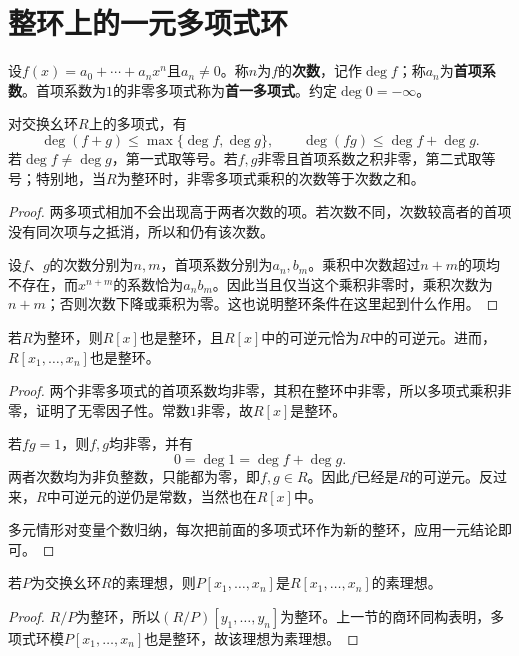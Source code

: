 \section{整环上的一元多项式环}

\begin{definition}
设$f(x)=a_0+\cdots+a_nx^n$且$a_n\ne0$。称$n$为$f$的\textbf{次数}，记作$\deg f$；称$a_n$为\textbf{首项系数}。首项系数为$1$的非零多项式称为\textbf{首一多项式}。约定$\deg0=-\infty$。
\end{definition}

\begin{proposition}
对交换幺环$R$上的多项式，有
\[
\deg(f+g)\le\max\{\deg f,\deg g\},\qquad
\deg(fg)\le\deg f+\deg g.
\]
若$\deg f\ne\deg g$，第一式取等号。若$f,g$非零且首项系数之积非零，第二式取等号；特别地，当$R$为整环时，非零多项式乘积的次数等于次数之和。
\end{proposition}
\begin{proof}
两多项式相加不会出现高于两者次数的项。若次数不同，次数较高者的首项没有同次项与之抵消，所以和仍有该次数。

设$f$、$g$的次数分别为$n,m$，首项系数分别为$a_n,b_m$。乘积中次数超过$n+m$的项均不存在，而$x^{n+m}$的系数恰为$a_nb_m$。因此当且仅当这个乘积非零时，乘积次数为$n+m$；否则次数下降或乘积为零。这也说明整环条件在这里起到什么作用。
\end{proof}

\begin{proposition}
若$R$为整环，则$R[x]$也是整环，且$R[x]$中的可逆元恰为$R$中的可逆元。进而，$R[x_1,\ldots,x_n]$也是整环。
\end{proposition}
\begin{proof}
两个非零多项式的首项系数均非零，其积在整环中非零，所以多项式乘积非零，证明了无零因子性。常数$1$非零，故$R[x]$是整环。

若$fg=1$，则$f,g$均非零，并有
\[
0=\deg1=\deg f+\deg g.
\]
两者次数均为非负整数，只能都为零，即$f,g\in R$。因此$f$已经是$R$的可逆元。反过来，$R$中可逆元的逆仍是常数，当然也在$R[x]$中。

多元情形对变量个数归纳，每次把前面的多项式环作为新的整环，应用一元结论即可。
\end{proof}

\begin{corollary}
若$P$为交换幺环$R$的素理想，则$P[x_1,\ldots,x_n]$是$R[x_1,\ldots,x_n]$的素理想。
\end{corollary}
\begin{proof}
$R/P$为整环，所以$(R/P)[y_1,\ldots,y_n]$为整环。上一节的商环同构表明，多项式环模$P[x_1,\ldots,x_n]$也是整环，故该理想为素理想。
\end{proof}

